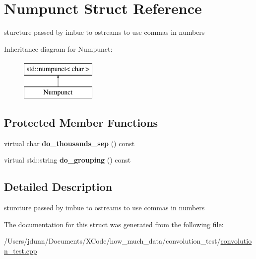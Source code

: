 \hypertarget{structNumpunct}{}\section{Numpunct Struct Reference}
\label{structNumpunct}


sturcture passed by imbue to ostreams to use commas in numbers  


Inheritance diagram for Numpunct\+:\begin{figure}[H]
\begin{center}
\leavevmode
\includegraphics[height=2.000000cm]{structNumpunct}
\end{center}
\end{figure}
\subsection*{Protected Member Functions}
\begin{DoxyCompactItemize}
\item 
\mbox{\label{structNumpunct_ab3c15bc6f961331e5ebe3657578da3a9}} 
virtual char {\bfseries do\+\_\+thousands\+\_\+sep} () const
\item 
\mbox{\label{structNumpunct_a52dd791172fbb2b434f9cd9548cd1aaa}} 
virtual std\+::string {\bfseries do\+\_\+grouping} () const
\end{DoxyCompactItemize}


\subsection{Detailed Description}
sturcture passed by imbue to ostreams to use commas in numbers 

The documentation for this struct was generated from the following file\+:\begin{DoxyCompactItemize}
\item 
/\+Users/jdunn/\+Documents/\+X\+Code/how\+\_\+much\+\_\+data/convolution\+\_\+test/\mbox{\hyperlink{convolution__test_8cpp}{convolution\+\_\+test.\+cpp}}\end{DoxyCompactItemize}
